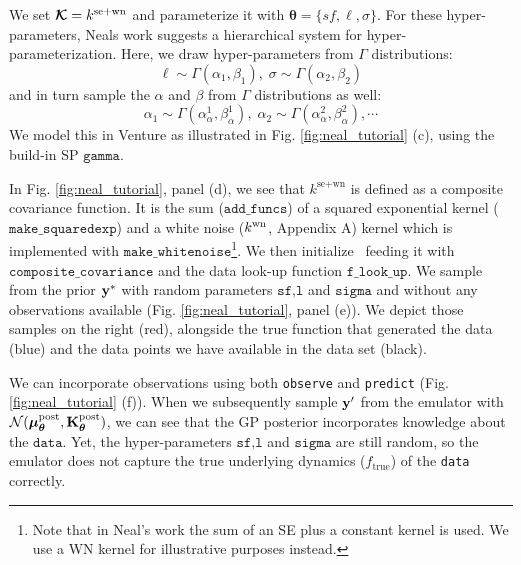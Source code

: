 We set $\bm{\mathcal{K}} = k^{\text{se}+\text{wn}}$ and parameterize it with $\bm{\theta}=\{sf,\ell,\sigma\}$.
For these hyper-parameters, Neals work suggests a hierarchical system for
hyper-parameterization.
Here, we draw hyper-parameters from $\Gamma$ distributions:
\begin{equation}
\label{eq:hyper-ell}
\ell \sim \Gamma(\alpha_1,\beta_1),\;\sigma \sim \Gamma(\alpha_2,\beta_2)
\end{equation} 
and in turn sample the $\alpha$ and $\beta$ from $\Gamma$ distributions as well:
\begin{equation}
\label{eq:hyper-alpha}
\alpha_1 \sim \Gamma(\alpha^1_{\alpha},\beta^1_{ \alpha } ),\; \alpha_2 \sim \Gamma(\alpha^2_{\alpha},\beta^2_{\alpha}),\cdots
\end{equation}
We model this in Venture as illustrated in Fig. \ref{fig:neal_tutorial} (c),
using the build-in \ac{SP} $\texttt{gamma}$. 

In Fig. \ref{fig:neal_tutorial}, panel (d), we see that $k^{\text{se}+\text{wn}}$
is defined as a composite covariance function. It is the sum ($\texttt{add\_funcs}$) of
a squared exponential kernel ($\texttt{make\_squaredexp}$) and a white noise
($k^\text{wn}$, Appendix A)
kernel which is implemented with $\texttt{make\_whitenoise}$\footnote{Note
that in Neal's work \citeyearpar{neal1997monte} the sum of an SE
plus a constant kernel is used. We use a WN kernel for illustrative purposes
instead.}. 
We then initialize \gpmem\ feeding it with $\texttt{composite\_covariance}$ and the data
look-up function $\texttt{f\_look\_up}$. 
We sample from the prior $\mathbf{y}^*$ with random parameters $\texttt{sf,l}$ and $\texttt{sigma}$ and 
without any observations available (Fig. \ref{fig:neal_tutorial}, panel (e)).
We depict those samples on the right (red), alongside the true function that generated the data (blue) and
the data points we have available in the data set (black).

We can incorporate observations using both \texttt{observe} and \texttt{predict} (Fig. \ref{fig:neal_tutorial} (f)).
When we subsequently sample $\mathbf{y}^\prime$ from the emulator with
$\mathcal{N}(\bm{\mu}_{\bm{\theta}}^\text{post},\mathbf{K}_{\bm{\theta}}^\text{post})$, we can see that the \ac{GP} posterior incorporates knowledge 
about the $\texttt{data}$. Yet, the hyper-parameters $\texttt{sf,l}$ and $\texttt{sigma}$ are still
random, so the emulator does not capture the true underlying dynamics
($f_\text{true}$) of the \texttt{data} correctly. 

